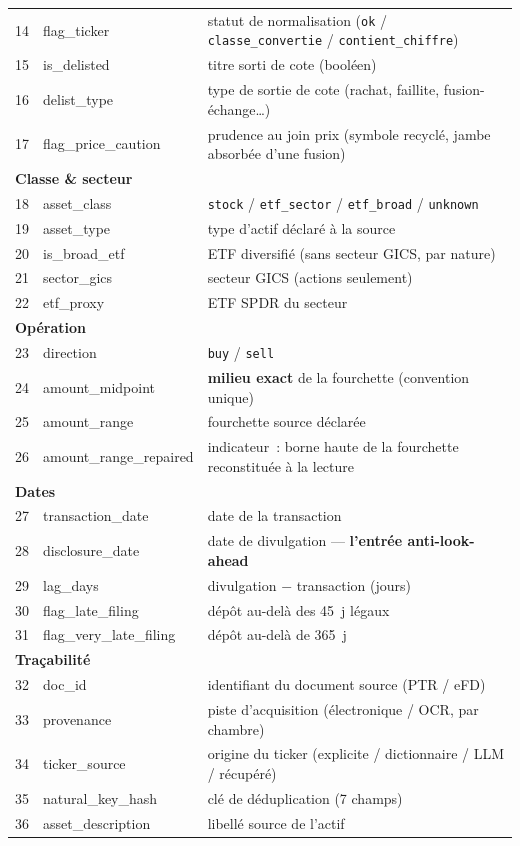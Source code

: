 \documentclass[11pt,a4paper]{article}
\newcommand{\co}[1]{\texttt{\small #1}}
\begin{document}
{\begin{longtable}{r >{\ttfamily}p{4.1cm} p{10.2cm}}
14 & flag_ticker & statut de normalisation (\co{ok} / \co{classe_convertie} / \co{contient_chiffre}) \\
15 & is_delisted & titre sorti de cote (booléen) \\
16 & delist_type & type de sortie de cote (rachat, faillite, fusion-échange\dots) \\
17 & flag_price_caution & prudence au join prix (symbole recyclé, jambe absorbée d'une fusion) \\
\midrule
\multicolumn{3}{l}{\bfseries Classe \& secteur}\\
18 & asset_class & \co{stock} / \co{etf_sector} / \co{etf_broad} / \co{unknown} \\
19 & asset_type & type d'actif déclaré à la source \\
20 & is_broad_etf & ETF diversifié (sans secteur GICS, par nature) \\
21 & sector_gics & secteur GICS (actions seulement) \\
22 & etf_proxy & ETF SPDR du secteur \\
\midrule
\multicolumn{3}{l}{\bfseries Opération}\\
23 & direction & \co{buy} / \co{sell} \\
24 & amount_midpoint & \textbf{milieu exact} de la fourchette (convention unique) \\
25 & amount_range & fourchette source déclarée \\
26 & amount_range_repaired & indicateur~: borne haute de la fourchette reconstituée à la lecture \\
\midrule
\multicolumn{3}{l}{\bfseries Dates}\\
27 & transaction_date & date de la transaction \\
28 & disclosure_date & date de divulgation — \textbf{l'entrée anti-look-ahead} \\
29 & lag_days & divulgation $-$ transaction (jours) \\
30 & flag_late_filing & dépôt au-delà des 45~j légaux \\
31 & flag_very_late_filing & dépôt au-delà de 365~j \\
\midrule
\multicolumn{3}{l}{\bfseries Traçabilité}\\
32 & doc_id & identifiant du document source (PTR / eFD) \\
33 & provenance & piste d'acquisition (électronique / OCR, par chambre) \\
34 & ticker_source & origine du ticker (explicite / dictionnaire / LLM / récupéré) \\
35 & natural_key_hash & clé de déduplication (7 champs) \\
36 & asset_description & libellé source de l'actif \\
\bottomrule
\end{longtable}}
\end{document}
